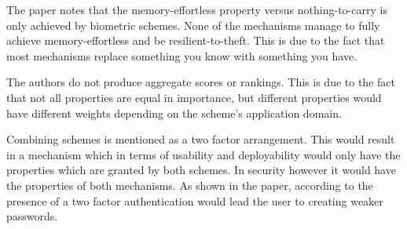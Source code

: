 The paper notes that the memory-effortless property versus nothing-to-carry is only achieved by biometric schemes. None of the mechanisms manage to fully achieve memory-effortless and be resilient-to-theft. This is due to the fact that most mechanisms replace something you know with something you have.

The authors do not produce aggregate scores or rankings. This is due to the fact that not all properties are equal in importance, but different properties would have different weights depending on the scheme's application domain. 

Combining schemes is mentioned as a two factor arrangement. This would result in a mechanism which in terms of usability and deployability would only have the properties which are granted by both schemes. In security however it would have the properties of both mechanisms. As shown in the paper, according to \cite{wimberly2011using} the presence of a two factor authentication would lead the user to creating weaker passwords.








